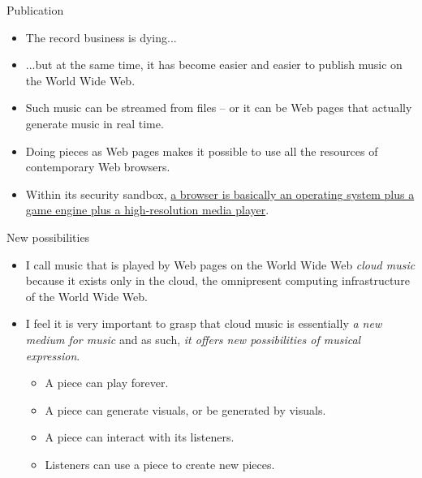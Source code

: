 \documentclass{beamer}
\begin{document}
\begin{frame}{Publication}
\begin{itemize}
\item The record business is dying...
\item ...but at the same time, it has become easier and easier to publish music on the World Wide Web.
\item Such music can be streamed from files -- or it can be Web pages that actually generate music in real time.
\item Doing pieces as Web pages makes it possible to use all the resources of contemporary Web browsers.
\item Within its security sandbox, \href{https://html5test.co/}{a browser is basically an operating system plus a game engine plus a high-resolution media player}.
\end{itemize}
\end{frame}

\begin{frame}{New possibilities}
\begin{itemize}
\item I call music that is played by Web pages on the World Wide Web \emph{cloud music} because it exists only in the cloud, the omnipresent computing infrastructure of the World Wide Web.
\item I feel it is very important to grasp that cloud music is essentially \emph{a new medium for music} and as such,\emph{ it offers new possibilities of musical expression}.
\begin{itemize}
\item A piece can play forever.
\item A piece can generate visuals, or be generated by visuals.
\item A piece can interact with its listeners.
\item Listeners can use a piece to create new pieces.
\end{itemize}
\end{itemize}
\end{frame}
\end{document}
